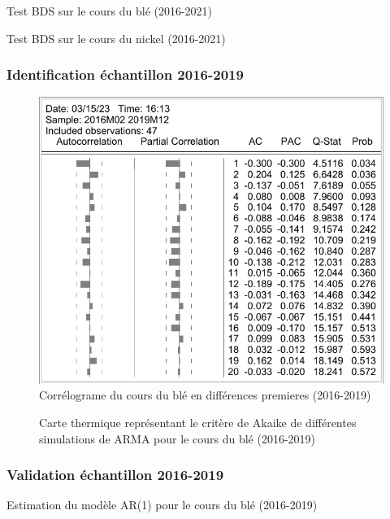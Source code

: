 \documentclass[12pt,a4paper]{article}
\begin{document}
\begin{table}[H]
    \centering
    \caption{Test BDS sur le cours du blé (2016-2021)}
    \sffamily
    \resizebox{0.9\textwidth}{!}{}
\end{table}

\begin{table}[H]
    \centering
    \caption{Test BDS sur le cours du nickel (2016-2021)}
    \sffamily
    \resizebox{0.9\textwidth}{!}{}
\end{table}
\subsubsection{Identification échantillon 2016-2019}
\begin{figure}[H]
    \centering
    \includegraphics[]{annexe/4_3_1_cor_dble19.pdf}
    \caption{Corrélograme du cours du blé en différences premieres (2016-2019)}
    \label{fig:cor_dble19}
\end{figure}

\begin{figure}[H]
    \centering
    \resizebox{\textwidth}{!}{}
    \caption{Carte thermique représentant le critère de Akaike de différentes simulations de ARMA pour le cours du blé (2016-2019)}
    \label{fig:arma_heatmap_19}
\end{figure}

\subsubsection{Validation échantillon 2016-2019}\label{appendix:valid19}
\begin{table}[H]
    \centering
    \caption{Estimation du modèle AR(1) pour le cours du blé (2016-2019)}
    \sffamily
    \resizebox{0.8\textwidth}{!}{}

\end{table}
\end{document}
